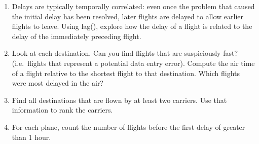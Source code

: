\documentclass[
]{article}
\begin{document}
\begin{enumerate}
\item
  Delays are typically temporally correlated: even once the problem that
  caused the initial delay has been resolved, later flights are delayed
  to allow earlier flights to leave. Using lag(), explore how the delay
  of a flight is related to the delay of the immediately preceding
  flight.
\item
  Look at each destination. Can you find flights that are suspiciously
  fast? (i.e.~flights that represent a potential data entry error).
  Compute the air time of a flight relative to the shortest flight to
  that destination. Which flights were most delayed in the air?
\item
  Find all destinations that are flown by at least two carriers. Use
  that information to rank the carriers.
\item
  For each plane, count the number of flights before the first delay of
  greater than 1 hour.
\end{enumerate}
\end{document}

